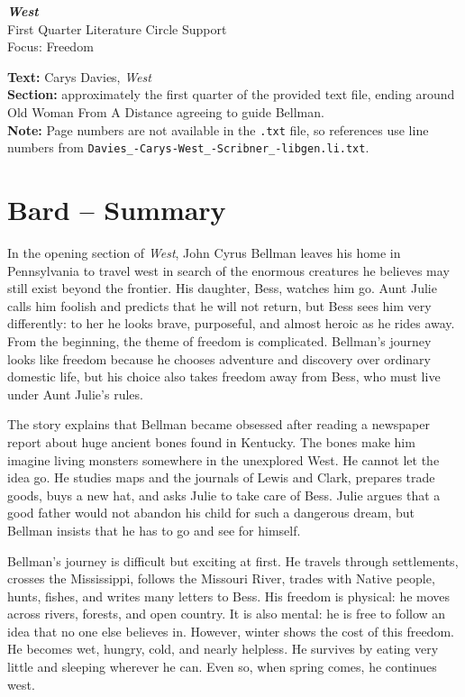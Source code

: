 \documentclass[11pt,a4paper]{article}
\begin{document}
\pagestyle{empty}
\begin{center}
    {\Huge\bfseries \textit{West}}\\[0.4em]
    {\Large First Quarter Literature Circle Support}\\[0.8em]
    {\large Focus: Freedom}
\end{center}

\vspace{1em}

\textbf{Text:} Carys Davies, \textit{West}\\
\textbf{Section:} approximately the first quarter of the provided text file, ending around Old Woman From A Distance agreeing to guide Bellman.\\
\textbf{Note:} Page numbers are not available in the \texttt{.txt} file, so references use line numbers from \texttt{Davies\_-Carys-West\_-Scribner\_-libgen.li.txt}.

\newpage

\section{Bard -- Summary}

In the opening section of \textit{West}, John Cyrus Bellman leaves his home in Pennsylvania to travel west in search of the enormous creatures he believes may still exist beyond the frontier. His daughter, Bess, watches him go. Aunt Julie calls him foolish and predicts that he will not return, but Bess sees him very differently: to her he looks brave, purposeful, and almost heroic as he rides away. From the beginning, the theme of freedom is complicated. Bellman's journey looks like freedom because he chooses adventure and discovery over ordinary domestic life, but his choice also takes freedom away from Bess, who must live under Aunt Julie's rules.

The story explains that Bellman became obsessed after reading a newspaper report about huge ancient bones found in Kentucky. The bones make him imagine living monsters somewhere in the unexplored West. He cannot let the idea go. He studies maps and the journals of Lewis and Clark, prepares trade goods, buys a new hat, and asks Julie to take care of Bess. Julie argues that a good father would not abandon his child for such a dangerous dream, but Bellman insists that he has to go and see for himself.

Bellman's journey is difficult but exciting at first. He travels through settlements, crosses the Mississippi, follows the Missouri River, trades with Native people, hunts, fishes, and writes many letters to Bess. His freedom is physical: he moves across rivers, forests, and open country. It is also mental: he is free to follow an idea that no one else believes in. However, winter shows the cost of this freedom. He becomes wet, hungry, cold, and nearly helpless. He survives by eating very little and sleeping wherever he can. Even so, when spring comes, he continues west.
\end{document}
